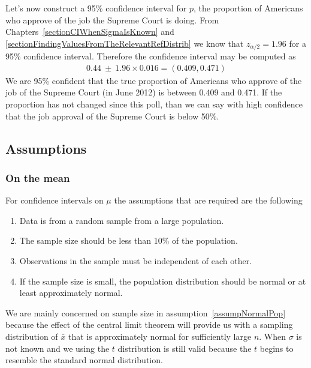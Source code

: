Let's now construct a 95\% confidence interval for $p$, the proportion of Americans who approve of the job the Supreme Court is doing.
From Chapters~\ref{sectionCIWhenSigmaIsKnown} and \ref{sectionFindingValuesFromTheRelevantRefDistrib}
we know that $z_{\alpha/2} = 1.96$ for a 95\% confidence interval.
Therefore the confidence interval may be computed as
\begin{eqnarray*}
0.44 \ \pm\ 1.96\times 0.016 = (0.409, 0.471)
\end{eqnarray*}
We are 95\% confident that the true proportion of Americans who approve of the job of the Supreme Court (in June 2012) is between 0.409 and 0.471. If the proportion has not changed since this poll, than we can say with high confidence that the job approval of the Supreme Court is below 50\%.






\subsection{Assumptions}

\subsubsection{On the mean}

For confidence intervals on $\mu$ the assumptions that are required are the following

\begin{enumerate}
\item	Data is from a random sample from a large population.
\item	The sample size should be less than 10\% of the population.
\item	Observations in the sample must be independent of each other.
\item	If the sample size is small, the population distribution should be normal or at least approximately normal. \label{assumpNormalPop}
\end{enumerate}

We are mainly concerned on sample size in assumption~\ref{assumpNormalPop} because the effect of the central limit theorem will provide us with a sampling distribution of $\bar{x}$ that is approximately normal for sufficiently large $n$.
When $\sigma$ is not known and we using the $t$ distribution is still valid because the $t$ begins
to resemble the standard normal distribution.



